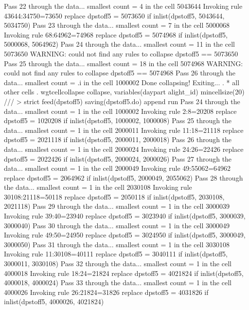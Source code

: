 Pass 22 through the data...
  smallest count = 4 in the cell      5043644
  Invoking rule 43644:34750=73650
  replace dpstoff5 = 5073650 if inlist(dpstoff5, 5043644, 5034750)
Pass 23 through the data...
  smallest count = 7 in the cell      5000068
  Invoking rule 68:64962=74968
  replace dpstoff5 = 5074968 if inlist(dpstoff5, 5000068, 5064962)
Pass 24 through the data...
  smallest count = 11 in the cell      5073650
  WARNING: could not find any rules to collapse dpstoff5 == 5073650
Pass 25 through the data...
  smallest count = 18 in the cell      5074968
  WARNING: could not find any rules to collapse dpstoff5 == 5074968
Pass 26 through the data...
  smallest count = .i in the cell      1000002
  Done collapsing! Exiting...
{\smallskip}
. * all other cells
. wgtcellcollapse collapse, variables(daypart alight_id) mincellsize(20) ///
>         strict feed(dpstoff5) saving(dpstoff5.do) append run
Pass 24 through the data...
  smallest count = 1 in the cell      1000002
  Invoking rule 2:8=20208
  replace dpstoff5 = 1020208 if inlist(dpstoff5, 1000002, 1000008)
Pass 25 through the data...
  smallest count = 1 in the cell      2000011
  Invoking rule 11:18=21118
  replace dpstoff5 = 2021118 if inlist(dpstoff5, 2000011, 2000018)
Pass 26 through the data...
  smallest count = 1 in the cell      2000024
  Invoking rule 24:26=22426
  replace dpstoff5 = 2022426 if inlist(dpstoff5, 2000024, 2000026)
Pass 27 through the data...
  smallest count = 1 in the cell      2000049
  Invoking rule 49:55062=64962
  replace dpstoff5 = 2064962 if inlist(dpstoff5, 2000049, 2055062)
Pass 28 through the data...
  smallest count = 1 in the cell      2030108
  Invoking rule 30108:21118=50118
  replace dpstoff5 = 2050118 if inlist(dpstoff5, 2030108, 2021118)
Pass 29 through the data...
  smallest count = 1 in the cell      3000039
  Invoking rule 39:40=23940
  replace dpstoff5 = 3023940 if inlist(dpstoff5, 3000039, 3000040)
Pass 30 through the data...
  smallest count = 1 in the cell      3000049
  Invoking rule 49:50=24950
  replace dpstoff5 = 3024950 if inlist(dpstoff5, 3000049, 3000050)
Pass 31 through the data...
  smallest count = 1 in the cell      3030108
  Invoking rule 11:30108=40111
  replace dpstoff5 = 3040111 if inlist(dpstoff5, 3000011, 3030108)
Pass 32 through the data...
  smallest count = 1 in the cell      4000018
  Invoking rule 18:24=21824
  replace dpstoff5 = 4021824 if inlist(dpstoff5, 4000018, 4000024)
Pass 33 through the data...
  smallest count = 1 in the cell      4000026
  Invoking rule 26:21824=31826
  replace dpstoff5 = 4031826 if inlist(dpstoff5, 4000026, 4021824)
